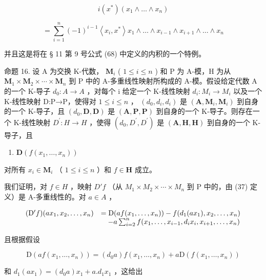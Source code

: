 \[
i \left(x ^ {*}\right) \left(x _ {1} \wedge \dots \wedge x _ {n}\right)
\]

\[
= \sum_ {i = 1} ^ {n} (- 1) ^ {i - 1} \left\langle x _ {i}, x ^ {*} \right\rangle x _ {1} \wedge \dots \wedge x _ {i - 1} \wedge x _ {i + 1} \wedge \dots \wedge x _ {n}
\]

并且这是将在 § 11 第 9 号公式 (68) 中定义的内积的一个特例。

命题 16. 设 A 为交换 K-代数， \(\mathbf{M}_i\) ( \(1 \leqslant i \leqslant n\) ) 和 P 为 A-模，H 为从 \(\mathbf{M}_1 \times \mathbf{M}_2 \times \cdots \times \mathbf{M}_n\) 到 P 中的 A-多重线性映射所构成的 A-模。假设给定代数 A 的一个 K-导子 \(d_{0}:A\to A\) ，对每个 i 给定一个 K-线性映射 \(d_{i}:M_{i}\to M_{i}\) 以及一个 K-线性映射 D:P→P，使得对 \(1\leqslant i\leqslant n\) ， \((d_{0},d_{i},d_{i})\) 是 \((\mathbf{A},\mathbf{M}_{i},\mathbf{M}_{i})\) 到自身的一个 K-导子，且 \((d_{0},\mathbf{D},\mathbf{D})\) 是 \((\mathbf{A},\mathbf{P},\mathbf{P})\) 到自身的一个 K-导子。则存在一个 K-线性映射 \(D^{\prime}:H\to H\) ，使得 \((d_{0},D^{\prime},D^{\prime})\) 是 \((\mathbf{A},\mathbf{H},\mathbf{H})\) 到自身的一个 K-导子，且

\begin{enumerate}
\def\labelenumi{(\arabic{enumi})}
\setcounter{enumi}{36}
\tightlist
\item
  \(\mathbf{D}(f(x_1, \ldots, x_n))\)
\end{enumerate}

对所有 \(x_{i} \in \mathbf{M}_{i}\) （ \(1 \leqslant i \leqslant n\) ）和 \(f \in \mathbf{H}\) 成立。

我们证明，对 \(f \in H\) ，映射 \(D'f\) （从 \(M_{1} \times M_{2} \times \cdots \times M_{n}\) 到 P 中的，由 (37) 定义）是 A-多重线性的。对 \(a \in A\) ，

\[
\begin{array}{r l} (\mathrm{D} ^ {\prime} f) (a x _ {1}, x _ {2}, \ldots , x _ {n}) & = \mathrm{D} (a f (x _ {1}, \ldots , x _ {n})) - f (d _ {1} (a x _ {1}), x _ {2}, \ldots , x _ {n}) \\ & \quad - a \sum_ {i = 2} ^ {n} f (x _ {1}, \ldots , x _ {i - 1}, d _ {i} x _ {i}, x _ {i + 1}, \ldots , x _ {n}) \end{array}
\]

且根据假设

\[
\mathrm{D} (a f (x _ {1}, \dots , x _ {n})) = (d _ {0} a) f (x _ {1}, \dots , x _ {n}) + a \mathrm{D} (f (x _ {1}, \dots , x _ {n}))
\]

和 \(d_{1}(ax_{1}) = (d_{0}a)x_{1} + a.d_{1}x_{1}\) ，这给出

